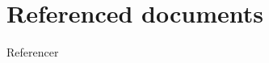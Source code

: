 \documentclass[Main]{subfiles}
\begin{document}
\chapter{Referenced documents}
Referencer 
\end{document}
